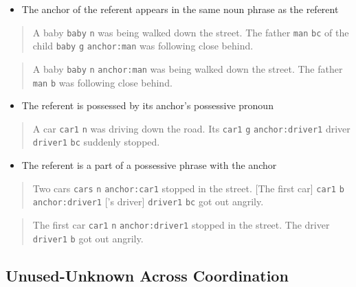 \documentclass[
]{book}
\providecommand{\tightlist}{%
  \setlength{\itemsep}{0pt}\setlength{\parskip}{0pt}}
\begin{document}
\begin{itemize}
\tightlist
\item
  The anchor of the referent appears in the same noun phrase as the referent
\end{itemize}

\begin{quote}
A baby \texttt{baby} \texttt{n} was being walked down the street.
The father \texttt{man} \texttt{bc} of the child \texttt{baby} \texttt{g} \texttt{anchor:man} was following close behind.
\end{quote}

\begin{quote}
A baby \texttt{baby} \texttt{n} \texttt{anchor:man} was being walked down the street.
The father \texttt{man} \texttt{b} was following close behind.
\end{quote}

\begin{itemize}
\tightlist
\item
  The referent is possessed by its anchor's possessive pronoun
\end{itemize}

\begin{quote}
A car \texttt{car1} \texttt{n} was driving down the road.
Its \texttt{car1} \texttt{g} \texttt{anchor:driver1} driver \texttt{driver1} \texttt{bc} suddenly stopped.
\end{quote}

\begin{itemize}
\tightlist
\item
  The referent is a part of a possessive phrase with the anchor
\end{itemize}

\begin{quote}
Two cars \texttt{cars} \texttt{n} \texttt{anchor:car1} stopped in the street.
{[}The first car{]} \texttt{car1} \texttt{b} \texttt{anchor:driver1}
{[}'s driver{]} \texttt{driver1} \texttt{bc} got out angrily.
\end{quote}

\begin{quote}
The first car \texttt{car1} \texttt{n} \texttt{anchor:driver1} stopped in the street.
The driver \texttt{driver1} \texttt{b} got out angrily.
\end{quote}

\hypertarget{unused-unknown-across-coordination}{%
\subsection{Unused-Unknown Across Coordination}\label{unused-unknown-across-coordination}}
\end{document}
